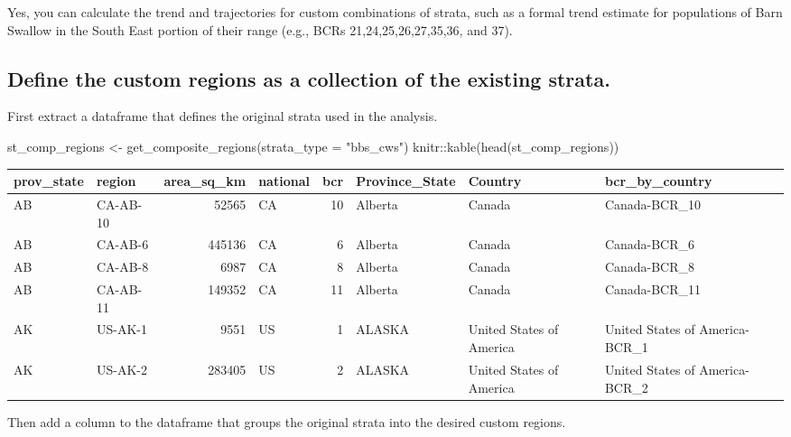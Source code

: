 \documentclass[
]{book}
\newenvironment{Shaded}{\begin{snugshade}}{\end{snugshade}}
\newcommand{\AttributeTok}[1]{\textcolor[rgb]{0.77,0.63,0.00}{#1}}
\newcommand{\FunctionTok}[1]{\textcolor[rgb]{0.00,0.00,0.00}{#1}}
\newcommand{\NormalTok}[1]{#1}
\newcommand{\OtherTok}[1]{\textcolor[rgb]{0.56,0.35,0.01}{#1}}
\newcommand{\SpecialCharTok}[1]{\textcolor[rgb]{0.00,0.00,0.00}{#1}}
\newcommand{\StringTok}[1]{\textcolor[rgb]{0.31,0.60,0.02}{#1}}
\begin{document}
Yes, you can calculate the trend and trajectories for custom combinations of strata, such as a formal trend estimate for populations of Barn Swallow in the South East portion of their range (e.g., BCRs 21,24,25,26,27,35,36, and 37).

\hypertarget{define-the-custom-regions-as-a-collection-of-the-existing-strata.}{%
\subsection{Define the custom regions as a collection of the existing strata.}\label{define-the-custom-regions-as-a-collection-of-the-existing-strata.}}

First extract a dataframe that defines the original strata used in the analysis.

\begin{Shaded}
\begin{Highlighting}[]
\NormalTok{st\_comp\_regions }\OtherTok{\textless{}{-}} \FunctionTok{get\_composite\_regions}\NormalTok{(}\AttributeTok{strata\_type =} \StringTok{"bbs\_cws"}\NormalTok{)}
\NormalTok{knitr}\SpecialCharTok{::}\FunctionTok{kable}\NormalTok{(}\FunctionTok{head}\NormalTok{(st\_comp\_regions))}
\end{Highlighting}
\end{Shaded}

\begin{tabular}{l|l|r|l|r|l|l|l}
\hline
prov\_state & region & area\_sq\_km & national & bcr & Province\_State & Country & bcr\_by\_country\\
\hline
AB & CA-AB-10 & 52565 & CA & 10 & Alberta & Canada & Canada-BCR\_10\\
\hline
AB & CA-AB-6 & 445136 & CA & 6 & Alberta & Canada & Canada-BCR\_6\\
\hline
AB & CA-AB-8 & 6987 & CA & 8 & Alberta & Canada & Canada-BCR\_8\\
\hline
AB & CA-AB-11 & 149352 & CA & 11 & Alberta & Canada & Canada-BCR\_11\\
\hline
AK & US-AK-1 & 9551 & US & 1 & ALASKA & United States of America & United States of America-BCR\_1\\
\hline
AK & US-AK-2 & 283405 & US & 2 & ALASKA & United States of America & United States of America-BCR\_2\\
\hline
\end{tabular}

Then add a column to the dataframe that groups the original strata into the desired custom regions.
\end{document}

